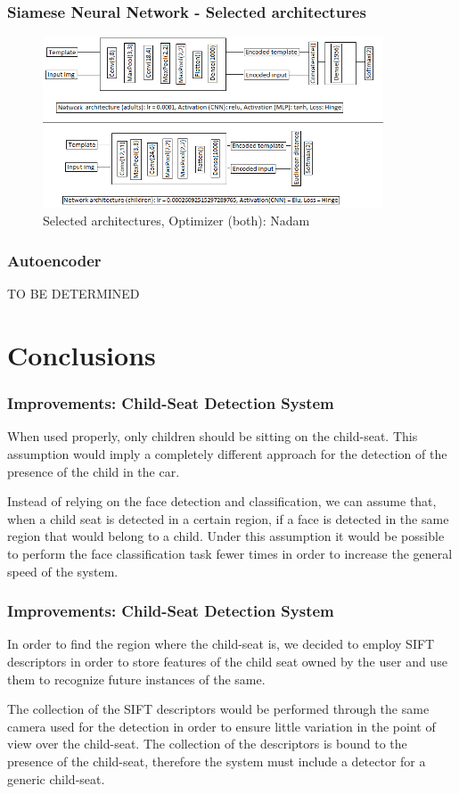 \documentclass{beamer}
\begin{document}
	\begin{frame}
		\frametitle {Siamese Neural Network - Selected architectures}
		\begin{figure}
			\centering
			\includegraphics[width=0.9\textwidth, height=0.65\textheight]{img/schema_modelli_unico.png}
    		\caption{Selected architectures, Optimizer (both): Nadam}
    		\label{fig:selected_architectures}
		\end{figure}
	\end{frame}
	
	\begin{frame}
		\frametitle{Autoencoder}
		TO BE DETERMINED
	\end{frame}
	
	\section{Conclusions}
	
	\begin{frame}
		\frametitle{Improvements: Child-Seat Detection System}
		When used properly, only children should be sitting on the child-seat. This assumption would imply a completely different approach for the detection of the presence of the child in the car.
		
		\bigskip
		
		Instead of relying on the face detection and classification, we can assume that, when a child seat is detected in a certain region, if a face is detected in the same region that would belong to a child. Under this assumption it would be possible to perform the face classification task fewer times in order to increase the general speed of  the system.
	\end{frame}

	\begin{frame}
		\frametitle{Improvements: Child-Seat Detection System}
		In order to find the region where the child-seat is, we decided to employ SIFT descriptors in order to store features of the child seat owned by the user and use them to recognize future instances of the same.
		
		\bigskip
		
		The collection of the SIFT descriptors would be performed through the same camera used for the detection in order to ensure little variation in the point of view over the child-seat. The collection of the descriptors is bound to the presence of the child-seat, therefore the system must include a detector for a generic child-seat.
	\end{frame}
\end{document}
